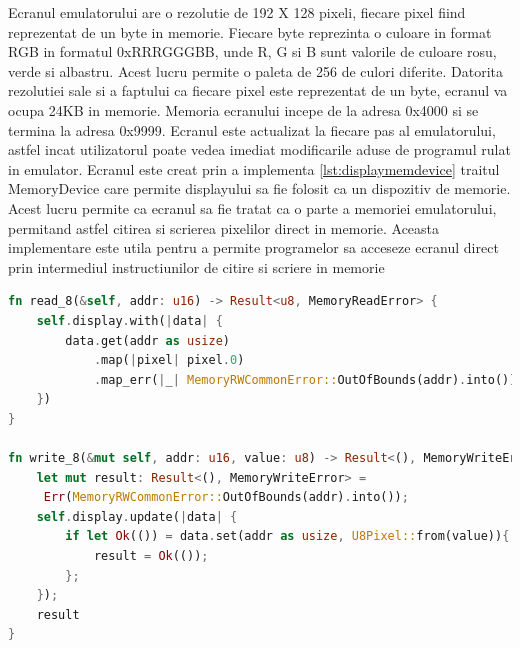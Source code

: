 \documentclass[titlepage,12pt]{article}
\DeclareRobustCommand{\code}[1]{{\ttfamily\small #1}}
\begin{document}
Ecranul emulatorului are o rezolutie de \code{192 X 128} pixeli, fiecare pixel fiind reprezentat de un byte in memorie. Fiecare byte reprezinta o culoare in format RGB in formatul \code{0xRRRGGGBB}, unde R, G si B sunt valorile de culoare rosu, verde si albastru. Acest lucru permite o paleta de 256 de culori diferite. Datorita rezolutiei sale si a faptului ca fiecare pixel este reprezentat de un byte, ecranul va ocupa 24KB in memorie. Memoria ecranului incepe de la adresa \code{0x4000} si se termina la adresa \code{0x9999}. Ecranul este actualizat la fiecare pas al emulatorului, astfel incat utilizatorul poate vedea imediat modificarile aduse de programul rulat in emulator.
Ecranul este creat prin a implementa \cref{lst:displaymemdevice} traitul \code{MemoryDevice} care permite displayului sa fie folosit ca un dispozitiv de memorie. Acest lucru permite ca ecranul sa fie tratat ca o parte a memoriei emulatorului, permitand astfel citirea si scrierea pixelilor direct in memorie. Aceasta implementare este utila pentru a permite programelor sa acceseze ecranul direct prin intermediul instructiunilor de citire si scriere in memorie



\begin{lstlisting}[language=Rust,caption={Implementare \code{MemoryDevice} display},label={lst:displaymemdevice}]
fn read_8(&self, addr: u16) -> Result<u8, MemoryReadError> {
    self.display.with(|data| {
        data.get(addr as usize)
            .map(|pixel| pixel.0)
            .map_err(|_| MemoryRWCommonError::OutOfBounds(addr).into())
    })
}

fn write_8(&mut self, addr: u16, value: u8) -> Result<(), MemoryWriteError> {
    let mut result: Result<(), MemoryWriteError> =
     Err(MemoryRWCommonError::OutOfBounds(addr).into());
    self.display.update(|data| {
        if let Ok(()) = data.set(addr as usize, U8Pixel::from(value)){
            result = Ok(());
        };
    });
    result
}
\end{lstlisting}
\end{document}
